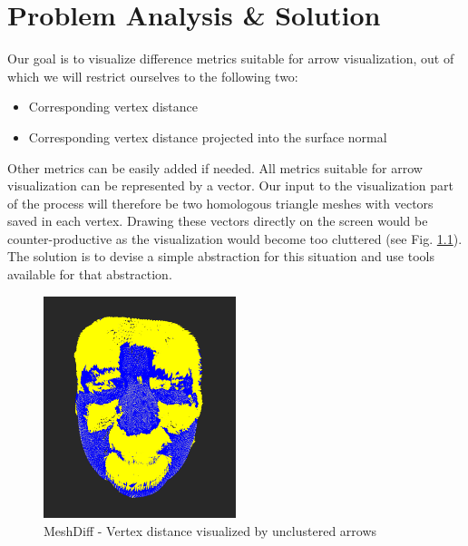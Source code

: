 \chapter{Problem Analysis \& Solution}

Our goal is to visualize difference metrics suitable for arrow visualization, out of which we will restrict ourselves to the following two:

\begin{itemize}
\item Corresponding vertex distance
\item Corresponding vertex distance projected into the surface normal
\end{itemize}

Other metrics can be easily added if needed. All metrics suitable for arrow visualization can be represented by a vector. Our input to the visualization part of the process will therefore be two homologous triangle meshes with vectors saved in each vertex. Drawing these vectors directly on the screen would be counter-productive as the visualization would become too cluttered (see Fig. \ref{fig:meshdiff_unclustered}). The solution is to devise a simple abstraction for this situation and use tools available for that abstraction.

\begin{figure}[h]
\centering
\includegraphics[width=0.5\textwidth]{./img/meshdiff-unclustered_arrows-single.png}
\caption{MeshDiff - Vertex distance visualized by unclustered arrows}
\label{fig:meshdiff_unclustered}
\end{figure}

